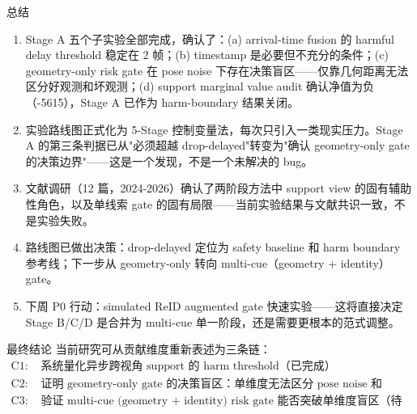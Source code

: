 \documentclass[aspectratio=169,xcolor=dvipsnames]{beamer}
\begin{document}
\begin{frame}{总结}
\small
\begin{enumerate}
  \item Stage A 五个子实验全部完成，确认了：(a) arrival-time fusion 的 harmful delay threshold 稳定在 2 帧；(b) timestamp 是必要但不充分的条件；(c) geometry-only risk gate 在 pose noise 下存在决策盲区——仅靠几何距离无法区分好观测和坏观测；(d) support marginal value audit 确认净值为负（-5615），Stage A 已作为 harm-boundary 结果关闭。
  \item 实验路线图正式化为 5-Stage 控制变量法，每次只引入一类现实压力。Stage A 的第三条判据已从"必须超越 drop-delayed"转变为"确认 geometry-only gate 的决策边界"——这是一个发现，不是一个未解决的 bug。
  \item 文献调研（12 篇，2024-2026）确认了两阶段方法中 support view 的固有辅助性角色，以及单线索 gate 的固有局限——当前实验结果与文献共识一致，不是实验失败。
  \item 路线图已做出决策：drop-delayed 定位为 safety baseline 和 harm boundary 参考线；下一步从 geometry-only 转向 multi-cue（geometry + identity）gate。
  \item 下周 P0 行动：simulated ReID augmented gate 快速实验——这将直接决定 Stage B/C/D 是合并为 multi-cue 单一阶段，还是需要更根本的范式调整。
\end{enumerate}

\begin{block}{最终结论}
当前研究可从贡献维度重新表述为三条链：
\[
\begin{aligned}
\text{C1: } & \text{系统量化异步跨视角 support 的 harm threshold（已完成）} \\
\text{C2: } & \text{证明 geometry-only gate 的决策盲区：单维度无法区分 pose noise 和 identity confusion（数据已完备）} \\
\text{C3: } & \text{验证 multi-cue (geometry + identity) risk gate 能否突破单维度盲区（待做）}
\end{aligned}
\]
\end{block}
\end{frame}
\end{document}
